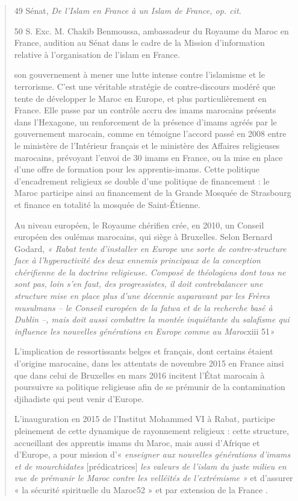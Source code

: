 \begin{quote}
49 Sénat, \emph{De l'Islam en France à un Islam de France, op. cit.}

50 S. Exc. M. Chakib Benmoussa, ambassadeur du Royaume du Maroc en
France, audition au Sénat dans le cadre de la Mission d'information
relative à l'organisation de l'islam en France.



son gouvernement à mener une lutte intense contre l'islamisme et le
terrorisme. C'est une véritable stratégie de contre-discours modéré que
tente de développer le Maroc en Europe, et plus particulièrement en
France. Elle passe par un contrôle accru des imams marocains présents
dans l'Hexagone, un renforcement de la présence d'imams agréés par le
gouvernement marocain, comme en témoigne l'accord passé en 2008 entre le
ministère de l'Intérieur français et le ministère des Affaires
religieuses marocains, prévoyant l'envoi de 30 imams en France, ou la
mise en place d'une offre de formation pour les apprentis-imams. Cette
politique d'encadrement religieux se double d'une politique de
financement : le Maroc participe ainsi au financement de la Grande
Mosquée de Strasbourg et finance en totalité la mosquée de
Saint-Étienne.

Au niveau européen, le Royaume chérifien crée, en 2010, un Conseil
européen des oulémas marocains, qui siège à Bruxelles. Selon Bernard
Godard, \emph{« Rabat tente d'installer en Europe une sorte de
contre-structure face à l'hyperactivité des deux ennemis principaux de
la conception chérifienne de la doctrine religieuse. Composé de
théologiens dont tous ne sont pas, loin s'en faut, des progressistes, il
doit contrebalancer une structure mise en place plus d'une décennie
auparavant par les Frères musulmans -- le Conseil européen de la fatwa
et de la recherche basé à Dublin --, mais doit aussi combattre la montée
inquiétante du salafisme qui influence les nouvelles générations en
Europe comme au Maroc}xiii 51\emph{»}

L'implication de ressortissants belges et français, dont certains
étaient d'origine marocaine, dans les attentats de novembre 2015 en
France ainsi que dans celui de Bruxelles en mars 2016 incitent l'État
marocain à poursuivre sa politique religieuse afin de se prémunir de la
contamination djihadiste qui peut venir d'Europe.

L'inauguration en 2015 de l'Institut Mohammed VI à Rabat, participe
pleinement de cette dynamique de rayonnement religieux : cette
structure, accueillant des apprentis imams du Maroc, mais aussi
d'Afrique et d'Europe, a pour mission d'« \emph{enseigner aux nouvelles
générations d'imams et de mourchidates} {[}prédicatrices{]} \emph{les
valeurs de l'islam du juste milieu en vue de prémunir le Maroc contre
les velléités de l'extrémisme »} et d'assurer « la sécurité spirituelle
du Maroc52 » et par extension de la France .


\end{quote}

